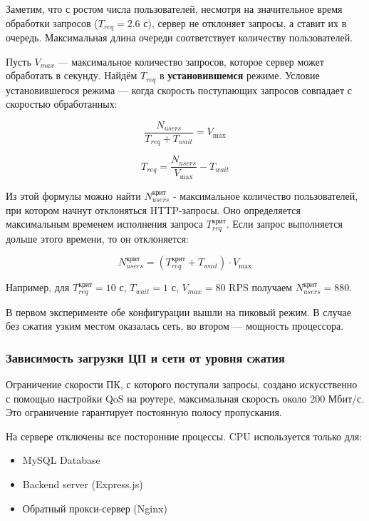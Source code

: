 \documentclass[12pt]{article}
\begin{document}
Заметим, что с ростом числа пользователей, несмотря на значительное время обработки запросов ($T_{req}=2.6$ с), сервер не отклоняет запросы,
а ставит их в очередь. Максимальная длина очереди соответствует количеству пользователей.

Пусть $V_{max}$ — максимальное количество запросов, которое сервер может обработать в секунду. Найдём $T_{req}$ в \textbf{установившемся} режиме.
Условие установившегося режима — когда скорость поступающих запросов совпадает с скоростью обработанных:

\[
    \frac{N_{users}}{T_{req} + T_{wait}} = V_{\text{max}}
\]

\[
    T_{req} = \frac{N_{users}}{V_{\text{max}}} - T_{wait}
\]

Из этой формулы можно найти $N^{\text{крит}}_{users}$ - максимальное количество пользователей, при котором начнут отклоняться HTTP-запросы.
Оно определяется максимальным временем исполнения запроса $T^{\text{крит}}_{req}$. Если запрос выполняется дольше этого времени, то он отклоняется:

\begin{equation}
    N^{\text{крит}}_{users} = (T^{\text{крит}}_{req} + T_{wait}) \cdot V_{\text{max}}
\end{equation}

Например, для $T^{\text{крит}}_{req} = 10$ с, $T_{wait}=1$ с, $V_{max}=80$ RPS получаем $N^{\text{крит}}_{users}=880$.

В первом эксперименте обе конфигурации вышли на пиковый режим. В случае без сжатия узким местом оказалась сеть, во втором — мощность процессора.

\subsubsection{Зависимость загрузки ЦП и сети от уровня сжатия}

Ограничение скорости ПК, с которого поступали запросы, создано искусственно с помощью настройки QoS на роутере,
максимальная скорость около 200 Мбит/с. Это ограничение гарантирует постоянную полосу пропускания.

На сервере отключены все посторонние процессы. CPU используется только для:
\begin{itemize}
    \item MySQL Database
    \item Backend server (Express.js)
    \item Обратный прокси-сервер (Nginx)
\end{itemize}
\end{document}

